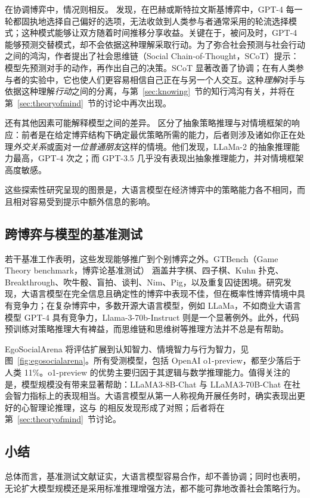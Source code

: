 在协调博弈中，情况则相反。\citet{akata2025playing} 发现，在巴赫或斯特拉文斯基博弈中，GPT-4 每一轮都固执地选择自己偏好的选项，无法收敛到人类参与者通常采用的轮流选择模式；这种模式能够让双方随着时间推移分享收益。关键在于，被问及时，GPT-4 能够预测交替模式，却不会依据这种理解采取行动。为了弥合社会预测与社会行动之间的鸿沟，作者提出了社会思维链（Social Chain-of-Thought，SCoT）提示：模型先预测对手的动作，再作出自己的决策。SCoT 显著改善了协调；在有人类参与者的实验中，它也使人们更容易相信自己正在与另一个人交互。这种{\em 理解}对手与依据这种理解{\em 行动}之间的分离，与第~\ref{sec:knowing}~节的知行鸿沟有关，并将在第~\ref{sec:theoryofmind}~节的讨论中再次出现。

还有其他因素可能解释模型之间的差异。\citet{lore2023strategic} 区分了抽象策略推理与对情境框架的响应：前者是在给定博弈结构下确定最优策略所需的能力，后者则涉及诸如你正在处理{\em 外交关系}或面对{\em 一位普通朋友}这样的情境。他们发现，LLaMa-2 的抽象推理能力最高，GPT-4 次之；而 GPT-3.5 几乎没有表现出抽象推理能力，并对情境框架高度敏感。

这些探索性研究呈现的图景是，大语言模型在经济博弈中的策略能力各不相同，而且相对容易受到提示中额外信息的影响。

\subsection{跨博弈与模型的基准测试}
若干基准工作表明，这些发现能够推广到个别博弈之外。GTBench（Game Theory benchmark，博弈论基准测试）\citep{duan2024gtbench} 涵盖井字棋、四子棋、Kuhn 扑克、Breakthrough、吹牛骰、盲拍、谈判、Nim、Pig，以及重复囚徒困境。研究发现，大语言模型在完全信息且确定性的博弈中表现不佳，但在概率性博弈情境中具有竞争力；在复杂博弈中，多数开源大语言模型，例如 LLaMa，不如商业大语言模型 GPT-4 具有竞争力，Llama-3-70b-Instruct 则是一个显著例外。此外，代码预训练对策略推理大有裨益，而思维链和思维树等推理方法并不总是有帮助。

EgoSocialArena \citep{hou2024entering} 将评估扩展到认知智力、情境智力与行为智力，见图~\ref{fig:egosocialarena}。所有受测模型，包括 OpenAI o1-preview，都至少落后于人类 11\%。o1-preview 的优势主要归因于其逻辑与数学推理能力。值得关注的是，模型规模没有带来显著帮助：LLaMA3-8B-Chat 与 LLaMA3-70B-Chat 在社会智力指标上的表现相当。大语言模型从第一人称视角开展任务时，确实表现出更好的心智理论推理，这与 \citet{kim-etal-2023-fantom} 的相反发现形成了对照；后者将在第~\ref{sec:theoryofmind}~节讨论。

\subsection{小结}
总体而言，基准测试文献证实，大语言模型容易合作，却不善协调；同时也表明，无论扩大模型规模还是采用标准推理增强方法，都不能可靠地改善社会策略行为。

